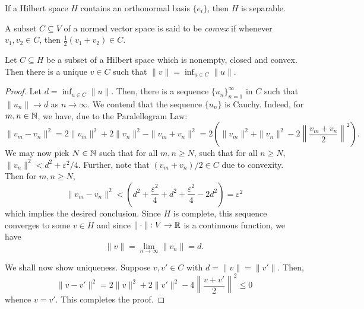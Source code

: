\begin{corollary}
    If a Hilbert space $H$ contains an orthonormal basis $\{e_{i}\}$, then $H$ is separable.
\end{corollary}

\begin{definition}[Convex]
    A subset $C\subseteq V$ of a normed vector space is said to be \emph{convex} if whenever $v_1,v_2\in C$, then $\frac{1}{2}(v_1 + v_2)\in C$.
\end{definition}

\begin{proposition}
    Let $C\subseteq H$ be a subset of a Hilbert space which is nonempty, closed and convex. Then there is a unique $v\in C$ such that $\displaystyle\|v\| = \inf_{u\in C}\|u\|$.
\end{proposition}
\begin{proof}
    Let $d = \inf_{u\in C}\|u\|$. Then, there is a sequence $\{u_n\}_{n = 1}^\infty$ in $C$ such that $\|u_n\|\to d$ as $n\to\infty$. We contend that the sequence $\{u_n\}$ is Cauchy. Indeed, for $m,n\in\mathbb{N}$, we have, due to the Paralellogram Law: 
    \begin{equation*}
        \|v_m - v_n\|^2 = 2\|v_m\|^2 + 2\|v_n\|^2 - \|v_m + v_n\|^2 = 2\left(\|v_m\|^2 + \|v_n\|^2 - 2\left\|\frac{v_m + v_n}{2}\right\|^2\right).
    \end{equation*}
    We may now pick $N\in\mathbb{N}$ such that for all $m,n\ge N$, such that for all $n\ge N$, $\|v_n\|^2 < d^2 + \varepsilon^2/4$. Further, note that $(v_m + v_n)/2\in C$ due to convexity. Then for $m,n\ge N$,
    \begin{equation*}
        \|v_m - v_n\|^2 < \left(d^2 + \frac{\varepsilon^2}{4} + d^2 + \frac{\varepsilon^2}{4} - 2d^2\right) = \varepsilon^2
    \end{equation*}
    which implies the desired conclusion. Since $H$ is complete, this sequence converges to some $v\in H$ and since $\|\cdot\|: V\to\mathbb{R}$ is a continuous function, we have 
    \begin{equation*}
        \|v\| = \lim_{n\to\infty}\|v_n\| = d.
    \end{equation*}

    We shall now show uniqueness. Suppose $v, v'\in C$ with $d = \|v\| = \|v'\|$. Then, 
    \begin{equation*}
        \|v - v'\|^2 = 2\|v\|^2 + 2\|v'\|^2 - 4\left\|\frac{v + v'}{2}\right\|^2\le 0
    \end{equation*}
    whence $v = v'$. This completes the proof.
\end{proof}

